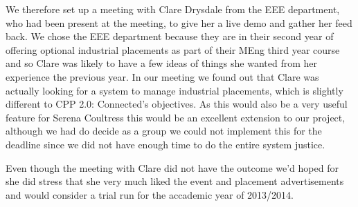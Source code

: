 \begin{itemize}
      We therefore set up a meeting with Clare Drysdale from the EEE department, who had been present at the meeting, to give her a live demo and gather her feed back. We chose the EEE department because they are in their second year of offering  optional industrial placements as part of their MEng third year course and so Clare was likely to have a few ideas of things she wanted from her experience the previous year. In our meeting we found out that Clare was actually looking for a system to manage industrial placements, which is slightly different to CPP 2.0: Connected's objectives. As this would also be a very useful feature for Serena Coultress this would be an excellent extension to our project, although we had do decide as a group we could not implement this for the deadline since we did not have enough time to do the entire system justice.
      
      Even though the meeting with Clare did not have the outcome we'd hoped for she did stress that she very much liked the event and placement advertisements and would consider a trial run for the accademic year of 2013/2014.
    \end{itemize}
   

    